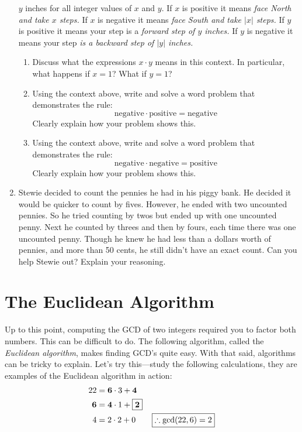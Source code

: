 \begin{problems}
\begin{enumerate}
  $y$ inches for all integer values of $x$ and $y$.  If $x$ is
  positive it means \textit{face North and take $x$ steps.} If $x$ is
  negative it means \textit{face South and take $|x|$ steps.} If $y$
  is positive it means your step is a \textit{forward step of $y$
    inches.} If $y$ is negative it means your step \textit{is a
    backward step of $|y|$ inches.}
\begin{enumerate}
\item Discuss what the expressions $x \cdot y$ means in this
  context. In particular, what happens if $x = 1$? What if $y=1$?
\item Using the context above, write and solve a word problem that
  demonstrates the rule:
\[
\text{negative}\cdot \text{positive} = \text{negative}
\]
Clearly explain how your problem shows this.
\item Using the context above, write and solve a word problem that
  demonstrates the rule:
\[
\text{negative}\cdot \text{negative} = \text{positive}
\]
Clearly explain how your problem shows this.
\end{enumerate}
\item Stewie decided to count the pennies he had in his piggy bank. He
  decided it would be quicker to count by fives. However, he ended
  with two uncounted pennies. So he tried counting by twos but ended
  up with one uncounted penny. Next he counted by threes and then by
  fours, each time there was one uncounted penny. Though he knew he
  had less than a dollars worth of pennies, and more than 50 cents, he
  still didn't have an exact count. Can you help Stewie out? Explain
  your reasoning.
\end{enumerate}
\end{problems}














\section{The Euclidean Algorithm}\label{S:EA}


Up to this point, computing the GCD of two integers required you to
factor both numbers.  This can be difficult to do. The following
algorithm, called the \textit{Euclidean algorithm}, makes finding
GCD's quite easy. With that said, algorithms can be tricky to
explain. Let's try this---study the following calculations, they are
examples of the Euclidean algorithm in action:
\begin{align*}
22 &= \boldsymbol{6}\cdot 3 + \boldsymbol{4}\\ 
\boldsymbol{6} &= \boldsymbol{4}
\cdot 1 + \fbox{$\boldsymbol{2}$}\\ 4 &= 2 \cdot 2 + 0 \qquad 
\fbox{$\therefore \gcd(22,6) = 2$}
\end{align*}

